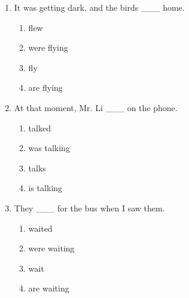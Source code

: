 \documentclass[11pt,a4paper]{ctexart}
\begin{document}
\begin{enumerate}[leftmargin=*,itemsep=4pt]
\begin{enumerate}[label=\Alph*.,leftmargin=2em,itemsep=1pt,topsep=2pt]
\item studied
\item was studying
\item study
\item am studying
\end{enumerate}
\item It was getting dark, and the birds \_\_\_ home.
\begin{enumerate}[label=\Alph*.,leftmargin=2em,itemsep=1pt,topsep=2pt]
\item flew
\item were flying
\item fly
\item are flying
\end{enumerate}
\item At that moment, Mr. Li \_\_\_ on the phone.
\begin{enumerate}[label=\Alph*.,leftmargin=2em,itemsep=1pt,topsep=2pt]
\item talked
\item was talking
\item talks
\item is talking
\end{enumerate}
\item They \_\_\_ for the bus when I saw them.
\begin{enumerate}[label=\Alph*.,leftmargin=2em,itemsep=1pt,topsep=2pt]
\item waited
\item were waiting
\item wait
\item are waiting
\end{enumerate}
\end{enumerate}
\end{document}
